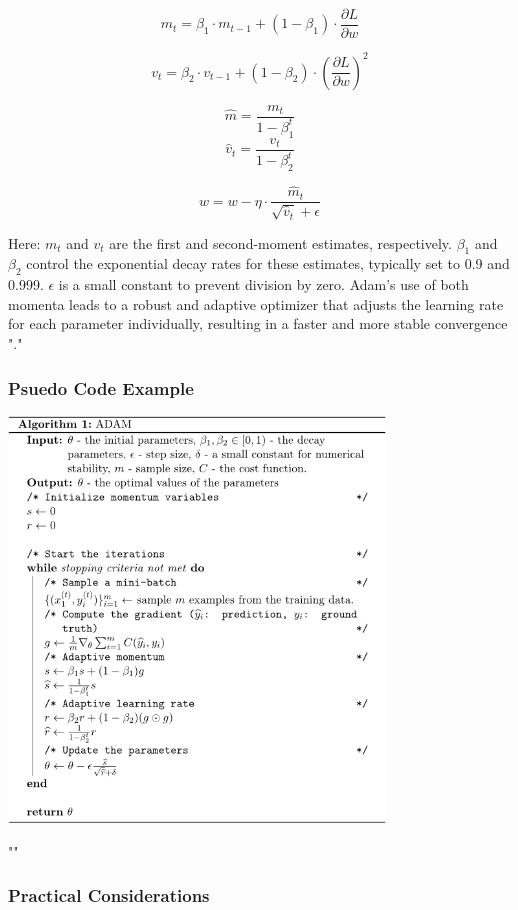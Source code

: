 \[m_t = \beta_1 \cdot m_{t-1} + (1 - \beta_1) \cdot \frac{\partial L}{\partial w}\]

\[v_t = \beta_2 \cdot v_{t-1} + (1 - \beta_2) \cdot (\frac{\partial L}{\partial w})^2\]

\[\hat{m} = \frac{m_t}{1 - \beta^{t}_{1}}\] \[\hat{v}_t = \frac{v_t}{1 - \beta^{t}_{2}}\]

\[w = w - \eta \cdot \frac{\hat{m}_t}{\sqrt{\hat{v}_t} + \epsilon}\]

Here: $m_t$ and $v_t$ are the first and second-moment estimates, respectively. $\beta_1$ and $\beta_2$ control the exponential decay rates for these estimates, typically set to 0.9 and 0.999. $\epsilon$ is a small constant to prevent division by zero.
Adam's use of both momenta leads to a robust and adaptive optimizer that adjusts the learning rate for each parameter individually, resulting in a faster and more stable convergence "\cite{haarnoja2019learningwalkdeepreinforcement}."

\subsubsection*{Psuedo Code Example}

\begin{center} 
\includegraphics[width=0.75\textwidth]{images/ADAM.png} 
\label{fig}
\end{center}
"\cite{haarnoja2019learningwalkdeepreinforcement}"

\subsubsection*{Practical Considerations}

